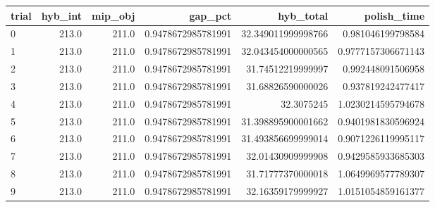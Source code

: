 \begin{tabular}{lrrrrr}
\hline
trial & hyb_int & mip_obj & gap_pct & hyb_total & polish_time \\ \hline
0 & 213.0 & 211.0 & 0.9478672985781991 & 32.349011999998766 & 0.981046199798584 \\
1 & 213.0 & 211.0 & 0.9478672985781991 & 32.043454000000565 & 0.9777157306671143 \\
2 & 213.0 & 211.0 & 0.9478672985781991 & 31.74512219999997 & 0.992448091506958 \\
3 & 213.0 & 211.0 & 0.9478672985781991 & 31.68826590000026 & 0.937819242477417 \\
4 & 213.0 & 211.0 & 0.9478672985781991 & 32.3075245 & 1.0230214595794678 \\
5 & 213.0 & 211.0 & 0.9478672985781991 & 31.398895900001662 & 0.9401981830596924 \\
6 & 213.0 & 211.0 & 0.9478672985781991 & 31.493856699999014 & 0.9071226119995117 \\
7 & 213.0 & 211.0 & 0.9478672985781991 & 32.01430909999908 & 0.9429585933685303 \\
8 & 213.0 & 211.0 & 0.9478672985781991 & 31.71777370000018 & 1.0649969577789307 \\
9 & 213.0 & 211.0 & 0.9478672985781991 & 32.16359179999927 & 1.0151054859161377 \\
\hline
\end{tabular}
